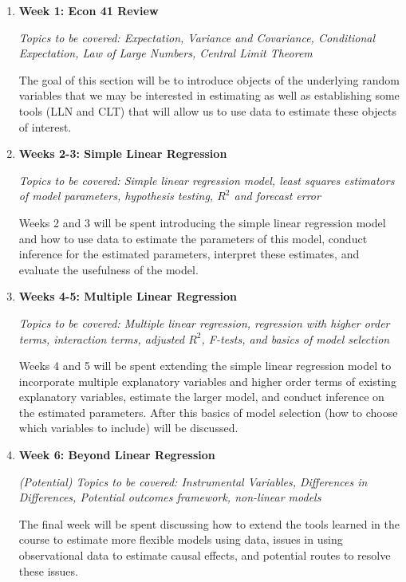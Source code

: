 \documentclass[10pt]{article}
\theoremstyle{exampstyle}
\begin{document}
\begin{enumerate}
  \item {\bf Week 1: Econ 41 Review}

  {\it Topics to be covered: Expectation, Variance and Covariance, Conditional Expectation, Law of Large Numbers, Central Limit Theorem }

  The goal of this section will be to introduce objects of the underlying random variables that we may be interested in estimating as well as establishing some tools (LLN and CLT) that will allow us to use data to estimate these objects of interest.

  \item {\bf Weeks 2-3: Simple Linear Regression}

  {\it Topics to be covered: Simple linear regression model, least squares estimators of model parameters, hypothesis testing, $R^2$ and forecast error}

  Weeks 2 and 3 will be spent introducing the simple linear regression model and how to use data to estimate the parameters of this model, conduct inference for the estimated parameters, interpret these estimates, and evaluate the usefulness of the model.

  \item {\bf Weeks 4-5: Multiple Linear Regression}

  {\it Topics to be covered: Multiple linear regression, regression with higher order terms, interaction terms, adjusted $R^2$, F-tests, and basics of model selection}

  Weeks 4 and 5 will be spent extending the simple linear regression model to incorporate multiple explanatory variables and higher order terms of existing explanatory variables, estimate the larger model, and conduct inference on the estimated parameters. After this basics of model selection (how to choose which variables to include) will be discussed. 

  \item {\bf Week 6: Beyond Linear Regression}

  {\it (Potential) Topics to be covered: Instrumental Variables, Differences in Differences, Potential outcomes framework, non-linear models} 

  The final week will be spent discussing how to extend the tools learned in the course to estimate more flexible models using data, issues in using observational data to estimate causal effects, and potential routes to resolve these issues.
\end{enumerate}
\end{document}
